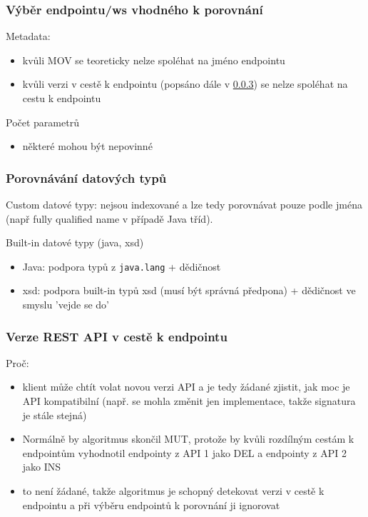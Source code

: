 \documentclass[czech,DP]{thesiskiv}
\begin{document}
\subsubsection{Výběr endpointu/ws vhodného k porovnání}

Metadata:
\begin{itemize}
	\item kvůli MOV se teoreticky nelze spoléhat na jméno endpointu
	\item kvůli verzi v cestě k endpointu (popsáno dále v \ref{sec:api-path-version}) se nelze spoléhat na cestu k endpointu
\end{itemize}

Počet parametrů
\begin{itemize}
	\item některé mohou být nepovinné
\end{itemize}
 
\subsubsection{Porovnávání datových typů}
Custom datové typy: nejsou indexované a lze tedy porovnávat pouze podle jména (např fully qualified name v případě Java tříd).
 
Built-in datové typy (java, xsd)

\begin{itemize}
	\item Java: podpora typů z \verb|java.lang| + dědičnost
	\item xsd: podpora built-in typů xsd (musí být správná předpona) + dědičnost ve smyslu 'vejde se do'
\end{itemize}

	
\subsubsection{Verze REST API v cestě k endpointu}	
\label{sec:api-path-version}

Proč: 

\begin{itemize}
	\item klient může chtít volat novou verzi API a je tedy žádané zjistit, jak moc je API kompatibilní (např. se mohla změnit jen implementace, takže signatura je stále stejná)
	
	\item Normálně by algoritmus skončil MUT, protože by kvůli rozdílným cestám k endpointům vyhodnotil endpointy z API 1 jako DEL a endpointy z API 2 jako INS
	
	\item to není žádané, takže algoritmus je schopný detekovat verzi v cestě k endpointu a při výběru endpointů k porovnání ji ignorovat
\end{itemize}
\end{document}
